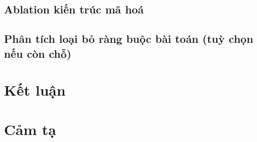 \documentclass[10pt, conference, a4paper, compsocconf]{IEEEtran}
\begin{document}
\subsection{Ablation kiến trúc mã hoá}

\subsection{Phân tích loại bỏ ràng buộc bài toán (tuỳ chọn nếu còn chỗ)}

\section{Kết luận}

\section*{Cảm tạ}



\end{document}
